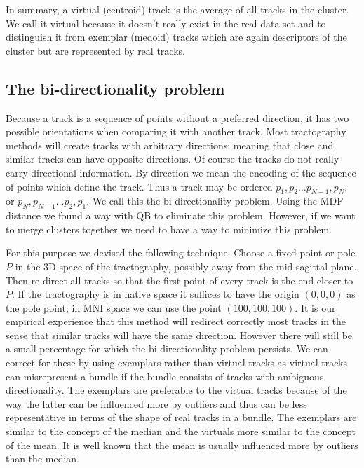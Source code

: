 \documentclass[preprint,authoryear,a4paper,10pt,onecolumn]{elsarticle}
\begin{document}
In summary, a virtual (centroid) track is the average of all tracks in
the cluster. We call it virtual because it doesn't really exist in the
real data set and to distinguish it from exemplar (medoid) tracks which
are again descriptors of the cluster but are represented by real tracks.


\subsection{The bi-directionality problem\label{sub:The-bi-directionality-problem}}

Because a track is a sequence of points without a preferred direction,
it has two possible orientations when comparing it with another track.
Most tractography methods will create tracks with arbitrary directions;
meaning that close and similar tracks can have opposite directions.  Of
course the tracks do not really carry directional information.  By
direction we mean the encoding of the sequence of points which define
the track. Thus a track may be ordered $p_{1},p_{2}\ldots
p_{N-1},p_{N}$, or $p_{N},p_{N-1}\ldots p_{2},p_{1}$. We call this the
bi-directionality problem. Using the MDF distance we found a way with QB
to eliminate this problem. However, if we want to merge clusters
together we need to have a way to minimize this problem.

For this purpose we devised the following technique. Choose a fixed
point or pole $P$ in the 3D space of the tractography, possibly away
from the mid-sagittal plane. Then re-direct all tracks so that the first
point of every track is the end closer to $P$. If the tractography is in
native space it suffices to have the origin $(0,0,0)$ as the pole point;
in MNI space we can use the point $(100,100,100)$. It is our empirical
experience that this method will redirect correctly most tracks in the
sense that similar tracks will have the same direction.  However there
will still be a small percentage for which the bi-directionality problem
persists. We can correct for these by using exemplars rather than
virtual tracks as virtual tracks can misrepresent a bundle if the bundle
consists of tracks with ambiguous directionality. The exemplars are
preferable to the virtual tracks because of the way the latter can be
influenced more by outliers and thus can be less representative in terms
of the shape of real tracks in a bundle. The exemplars are similar to
the concept of the median and the virtuals more similar to the concept
of the mean. It is well known that the mean is usually influenced more
by outliers than the median.
\end{document}

